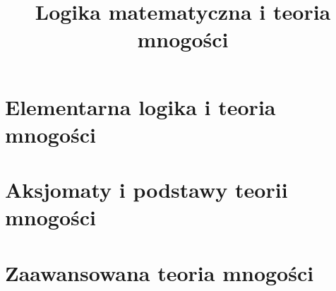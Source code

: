 \documentclass[11pt,a4paper,oneside,openany]{book}
\numberwithin{equation}{chapter}
\theoremstyle{plain}
\theoremstyle{definition}
\theoremstyle{remark}
\begin{document}
\frontmatter
\hypersetup{pageanchor=false} %
\title{Logika matematyczna i teoria mnogości}
\author{}
\date{}
\maketitle
\hypersetup{pageanchor=true}
\tableofcontents
\mainmatter
\part{Elementarna logika i teoria mnogości}








\part{Aksjomaty i podstawy teorii mnogości}




\part{Zaawansowana teoria mnogości}











\end{document}
